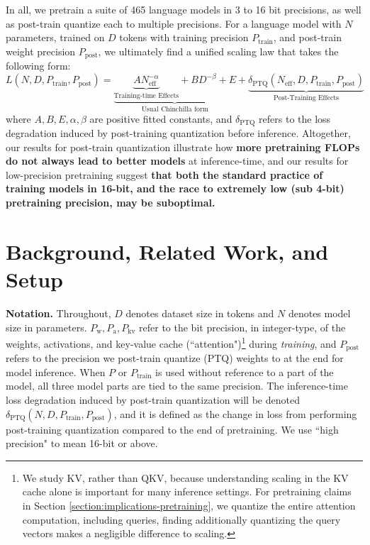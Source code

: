 \documentclass[11pt]{article}
\begin{document}
In all, we pretrain a suite of 465 language models in 3 to 16 bit precisions, as well as post-train quantize each to multiple precisions. For a language model with $N$ parameters, trained on $D$ tokens with training precision $P_\text{train}$, and post-train weight precision $P_\text{post}$, we ultimately find a unified scaling law that takes the following form:  
    \begin{equation}
        L(N, D, P_\text{train}, P_\text{post}) = \underbrace{\underbrace{AN_\text{eff}^{-\alpha}}_{\text{Training-time Effects}} + B D^{-\beta} + 
E}_\text{Usual Chinchilla form} + \underbrace{\delta_\text{PTQ}(N_\text{eff}, D, P_\text{train}, P_\text{post})}_{\text{Post-Training Effects}}
\end{equation}
where $A, B, E, \alpha, \beta$ are positive fitted constants, and $\delta_\text{PTQ}$ refers to the loss degradation induced by post-training quantization before inference. Altogether, our results for post-train quantization illustrate how \textbf{more pretraining FLOPs do not always lead to better models} at inference-time, and our results for low-precision pretraining suggest \textbf{that both the standard practice of training models in 16-bit, and the race to extremely low (sub 4-bit) pretraining precision, may be suboptimal. }

\section{Background, Related Work, and Setup}

\textbf{Notation.}
Throughout, $D$ denotes dataset size in tokens and $N$ denotes model size in parameters. $P_\text{w}, P_\text{a}, P_\text{kv}$ refer to the bit precision, in integer-type, of the weights, activations, and key-value cache (``attention")\footnote{We study KV, rather than QKV, because understanding scaling in the KV cache alone is important for many inference settings. For pretraining claims in Section \ref{section:implications-pretraining}, we quantize the entire attention computation, including queries, finding additionally quantizing the query vectors makes a negligible difference to scaling.} during \textit{training}, and $P_\text{post}$ refers to the precision we post-train quantize (PTQ) weights to at the end for model inference. When $P$ or $P_\text{train}$ is used without reference to a part of the model, all three model parts are tied to the same precision. The inference-time loss degradation induced by post-train quantization will be denoted $\delta_\text{PTQ}(N, D, P_\text{train}, P_\text{post})$, and it is defined as the change in loss from performing post-training quantization compared to the end of pretraining. We use ``high precision" to mean 16-bit or above. 
\end{document}
